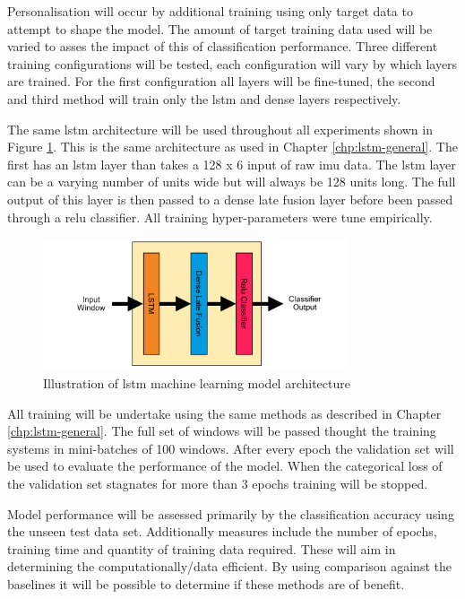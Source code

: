Personalisation will occur by additional training using only target data to attempt to shape the model. The amount of target training data used will be varied to asses the impact of this of classification performance. Three different training configurations will be tested, each configuration will vary by which layers are trained. For the first configuration all layers will be fine-tuned, the second and third method will train only the \acrshort{lstm} and dense layers respectively.

The same \acrshort{lstm} architecture will be used throughout all experiments shown in Figure \ref{fig:ch5_illustration_of_base_LSTM_model}. This is the same architecture as used in Chapter \ref{chp:lstm-general}. The first has an \acrshort{lstm} layer than takes a 128 x 6 input of raw \acrshort{imu} data. The \acrshort{lstm} layer can be a varying number of units wide but will always be 128 units long. The full output of this layer is then passed to a dense late fusion layer before been passed through a \acrshort{relu} classifier. All training hyper-parameters were tune empirically.

\begin{figure}[htbp]
    \centering
    \includegraphics[width=0.8\textwidth]{content/5-Personalisation/ch5_lstm_architecture.pdf}
    \caption[Illustration of  machine learning model architecture]{Illustration of \acrshort{lstm} machine learning model architecture}
    \label{fig:ch5_illustration_of_base_LSTM_model}
\end{figure}

All training will be undertake using the same methods as described in Chapter \ref{chp:lstm-general}. The full set of windows will be passed thought the training systems in mini-batches of 100 windows. After every epoch the validation set will be used to evaluate the performance of the model. When the categorical loss of the validation set stagnates for more than 3 epochs training will be stopped.

Model performance will be assessed primarily by the classification accuracy using the unseen test data set. Additionally measures include the number of epochs, training time and quantity of training data required. These will aim in determining the computationally/data efficient. By using comparison against the baselines it will be possible to determine if these methods are of benefit.


